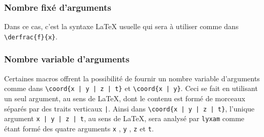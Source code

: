 \documentclass[12pt,a4paper]{article}
\begin{document}
\subsubsection{Nombre fixé d'arguments}

Dans ce cas, c'est la syntaxe \LaTeX{} usuelle qui sera à utiliser comme dans \verb+\derfrac{f}{x}+.



\subsubsection{Nombre variable d'arguments}

Certaines macros offrent la possibilité de fournir un nombre variable d'arguments comme dans \verb+\coord{x | y | z | t}+ et \verb+\coord{x | y}+.
Ceci se fait en utilisant un seul argument, au sens de \LaTeX{}, dont le contenu est formé de morceaux séparés par des traits verticaux \verb+|+.
Ainsi dans \verb+\coord{x | y | z | t}+, l'unique argument \verb+x | y | z | t+, au sens de \LaTeX{}, sera analysé par \verb+lyxam+ comme étant formé des quatre arguments \verb+x+ , \verb+y+ , \verb+z+ et \verb+t+.
\end{document}
